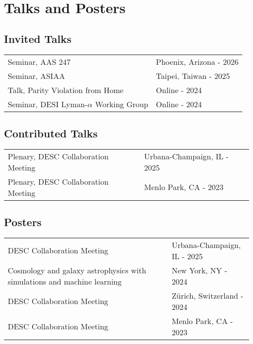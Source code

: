 \documentclass[a4paper,12pt]{article}
\begin{document}
\section{Talks and Posters}
\begin{adjustwidth}{2.0cm}{}
	\subsection*{\hspace{-2cm}Invited Talks}
	\begin{tabularx}{\linewidth}{@{}l X@{}}	
		Seminar, AAS 247 & \hfill Phoenix, Arizona - 2026 \\
		Seminar, ASIAA & \hfill Taipei, Taiwan - 2025 \\
		Talk, Parity Violation from Home & \hfill  Online - 2024 \\
		Seminar, DESI Lyman-$\alpha$ Working Group & \hfill Online - 2024 \\
	\end{tabularx}
\end{adjustwidth}

\begin{adjustwidth}{2.0cm}{}
	\subsection*{\hspace{-2cm}Contributed Talks}
	\begin{tabularx}{\linewidth}{@{}l X@{}}	
		Plenary, DESC Collaboration Meeting & \hfill Urbana-Champaign, IL - 2025 \\
		Plenary, DESC Collaboration Meeting & \hfill Menlo Park, CA - 2023 \\
	\end{tabularx}
\end{adjustwidth}

\begin{adjustwidth}{2.0cm}{}
	\subsection*{\hspace{-2cm}Posters}
	\begin{tabularx}{\linewidth}{X X}	
		DESC Collaboration Meeting & \hfill Urbana-Champaign, IL - 2025 \\
		Cosmology and galaxy astrophysics with simulations and machine learning &  \hfill New York, NY - 2024 \\
		DESC Collaboration Meeting & \hfill Z\"urich, Switzerland - 2024 \\
		DESC Collaboration Meeting & \hfill Menlo Park, CA - 2023 \\
	\end{tabularx}
\end{adjustwidth}
\end{document}
